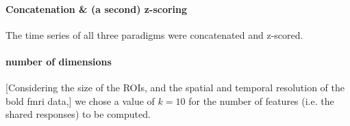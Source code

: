 \paragraph{Concatenation \& (a second) z-scoring}


The time series of all three paradigms were concatenated and z-scored.



\paragraph{number of dimensions}



[Considering the size of the ROIs, and the spatial and temporal resolution of
the \ac{bold} \ac{fmri} data,] we chose a value of $k=10$ for the number of
features (i.e. the shared responses) to be computed.

